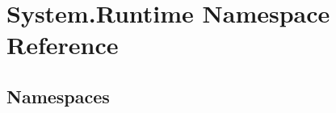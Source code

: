 \hypertarget{namespace_system_1_1_runtime}{}\section{System.\+Runtime Namespace Reference}
\label{namespace_system_1_1_runtime}
\subsection*{Namespaces}
\begin{DoxyCompactItemize}
\end{DoxyCompactItemize}
